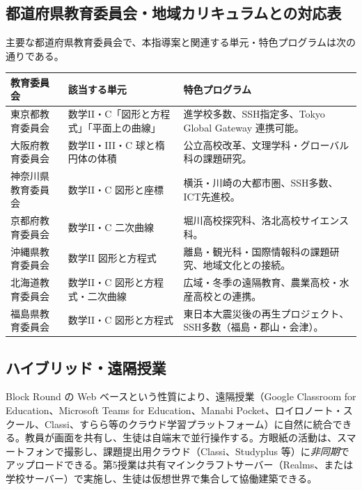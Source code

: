 \documentclass[12pt,a4paper]{scrartcl}
\begin{document}
\subsection{都道府県教育委員会・地域カリキュラムとの対応表}

主要な都道府県教育委員会で、本指導案と関連する単元・特色プログラムは次の通りである。

\begin{center}
\small
\begin{tabularx}{\textwidth}{@{}p{}p{}X@{}}
\toprule
\textbf{教育委員会} & \textbf{該当する単元} & \textbf{特色プログラム} \\
\midrule
東京都教育委員会 & 数学II・C「図形と方程式」「平面上の曲線」 & 進学校多数、SSH指定多、Tokyo Global Gateway 連携可能。 \\
\addlinespace[3pt]
大阪府教育委員会 & 数学II・III・C 球と楕円体の体積 & 公立高校改革、文理学科・グローバル科の課題研究。 \\
\addlinespace[3pt]
神奈川県教育委員会 & 数学II・C 図形と座標 & 横浜・川崎の大都市圏、SSH多数、ICT先進校。 \\
\addlinespace[3pt]
京都府教育委員会 & 数学II・C 二次曲線 & 堀川高校探究科、洛北高校サイエンス科。 \\
\addlinespace[3pt]
沖縄県教育委員会 & 数学II 図形と方程式 & 離島・観光科・国際情報科の課題研究、地域文化との接続。 \\
\addlinespace[3pt]
北海道教育委員会 & 数学II・C 図形と方程式・二次曲線 & 広域・冬季の遠隔教育、農業高校・水産高校との連携。 \\
\addlinespace[3pt]
福島県教育委員会 & 数学II・C 図形と方程式 & 東日本大震災後の再生プロジェクト、SSH多数（福島・郡山・会津）。 \\
\bottomrule
\end{tabularx}
\end{center}

\subsection{ハイブリッド・遠隔授業}
Block Round の Web ベースという性質により、遠隔授業（Google Classroom for Education、Microsoft Teams for Education、Manabi Pocket、ロイロノート・スクール、Classi、すらら等のクラウド学習プラットフォーム）に自然に統合できる。教員が画面を共有し、生徒は自端末で並行操作する。方眼紙の活動は、スマートフォンで撮影し、課題提出用クラウド（Classi、Studyplus 等）に\emph{非同期}でアップロードできる。第5授業は共有マインクラフトサーバー（Realms、または学校サーバー）で実施し、生徒は仮想世界で集合して協働建築できる。
\end{document}

